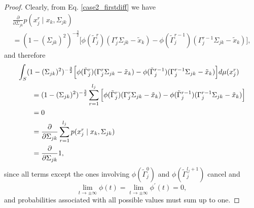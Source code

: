 \begin{lemma}
    \begin{proof}
        Clearly, from Eq. \eqref{case2_firstdiff} we have
        \begin{multline*}
            \frac{\partial }{\partial \Sigma_{jk}} p(x_j^{r} \mid x_{k}, \Sigma_{jk}) \\
            =  (1-(\Sigma_{jk})^2)^{-\frac{3}{2}}\Big[\phi({\tilde{\Gamma}}_j^{r})({\Gamma}_j^r\Sigma_{jk} - {\tilde{x}}_{k}) - \phi({\tilde{\Gamma}}_j^{r-1})({\Gamma}_j^{r-1}\Sigma_{jk} - {\tilde{x}}_{k})\Big],
        \end{multline*}
        and therefore
        \begin{align*}
            \MoveEqLeft \int_S (1-(\Sigma_{jk})^2)^{-\frac{3}{2}}\Big[\phi({\tilde{\Gamma}}_j^{r})({\Gamma}_j^r\Sigma_{jk} - {\tilde{x}}_{k}) - \phi({\tilde{\Gamma}}_j^{r-1})({\Gamma}_j^{r-1}\Sigma_{jk} - {\tilde{x}}_{k})\Big] d\mu(x^r_j) \\
             & = (1-(\Sigma_{jk})^2)^{-\frac{3}{2}} \sum_{r=1}^{l_{j}} \Big[\phi({\tilde{\Gamma}}_j^{r})({\Gamma}_j^r\Sigma_{jk} - {\tilde{x}}_{k}) - \phi({\tilde{\Gamma}}_j^{r-1})({\Gamma}_j^{r-1}\Sigma_{jk} - {\tilde{x}}_{k})\Big]       \\
             & = 0                                                                                                                                                                                                                             \\
             & = \frac{\partial }{\partial \Sigma_{jk}} \sum_{r=1}^{l_{j}} p(x_j^{r} \mid x_{k}, \Sigma_{jk})                                                                                                                                  \\
             & = \frac{\partial }{\partial \Sigma_{jk}} 1,
        \end{align*}
        since all terms except the ones involving $\phi({\tilde{\Gamma}}_j^{0})$ and $\phi({\tilde{\Gamma}}_j^{l_j +1})$ cancel and
        \begin{equation*}
            \lim\limits_{t \to \pm \infty} \phi(t) = \lim\limits_{t \to \pm \infty} \phi^\prime(t) = 0,
        \end{equation*}
        and probabilities associated with all possible values must sum up to one.
    \end{proof}
\end{lemma}

